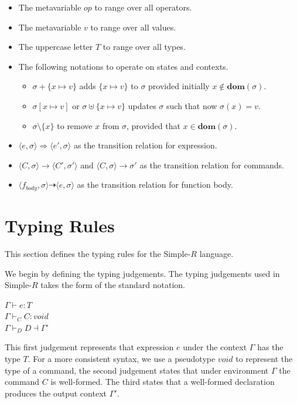 \documentclass[a4paper,12pt]{report}
\begin{document}
\renewcommand\labelitemii{$\blacksquare$}
\begin{itemize}
  \item The metavariable $op$ to range over all operators. 
  \item The metavariable $v$ to range over all values.
  \item The uppercase letter $T$ to range over all types.
  \item The following notations to operate on states and contexts. 
    \begin{itemize}
      \item $\sigma + \{x \mapsto v\}$ adds $\{x \mapsto v\}$ to $\sigma$ provided initially $x \notin\textbf{dom}(\sigma)$. 
      \item $\sigma[x \mapsto v]$ or $\sigma \uplus \{x \mapsto v\}$ updates $\sigma$ such that now $\sigma(x) = v$.
      \item $\sigma \setminus \{x\}$ to remove $x$ from $\sigma$, provided that $x \in \textbf{dom}(\sigma)$.
    \end{itemize}
  \item $\langle e, \sigma \rangle \Longrightarrow \langle e', \sigma \rangle$ as the transition relation for expression.
  \item $\langle C, \sigma \rangle \longrightarrow \langle C', \sigma' \rangle$ and $\langle C, \sigma \rangle \longrightarrow \sigma'$ as the transition relation for commands.
  \item $\langle f_{body}, \sigma \rangle \dashrightarrow \langle e, \sigma \rangle$ as the transition relation for function body.
\end{itemize}

\section{Typing Rules}
This section defines the typing rules for the Simple-$R$ language. 

\par
We begin by defining the typing judgements. The typing judgements used in 
Simple-$R$ takes the form of the standard notation. 
\begin{center}
  $\Gamma \vdash e : T$\\
  $\Gamma \vdash_{C} C : void$\\
  $\Gamma \vdash_{D} D \dashv \Gamma'$\\
\end{center}
This first judgement represents that expression $e$ 
under the context $\Gamma$ has the type $T$. For a more consistent syntax, 
we use a pseudotype $void$ to represent the type of a command, the second judgement 
states that under environment $\Gamma$ the command $C$ is well-formed. 
The third states that a well-formed declaration produces the output context $\Gamma'$. 
\end{document}
